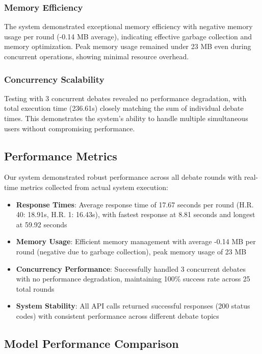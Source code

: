 \documentclass{article}
\begin{document}
\subsubsection{Memory Efficiency}
The system demonstrated exceptional memory efficiency with negative memory usage per round (-0.14 MB average), indicating effective garbage collection and memory optimization. Peak memory usage remained under 23 MB even during concurrent operations, showing minimal resource overhead.

\subsubsection{Concurrency Scalability}
Testing with 3 concurrent debates revealed no performance degradation, with total execution time (236.61s) closely matching the sum of individual debate times. This demonstrates the system's ability to handle multiple simultaneous users without compromising performance.

\subsection{Performance Metrics}

Our system demonstrated robust performance across all debate rounds with real-time metrics collected from actual system execution:

\begin{itemize}
    \item \textbf{Response Times}: Average response time of 17.67 seconds per round (H.R. 40: 18.91s, H.R. 1: 16.43s), with fastest response at 8.81 seconds and longest at 59.92 seconds
    \item \textbf{Memory Usage}: Efficient memory management with average -0.14 MB per round (negative due to garbage collection), peak memory usage of 23 MB
    \item \textbf{Concurrency Performance}: Successfully handled 3 concurrent debates with no performance degradation, maintaining 100\% success rate across 25 total rounds
    \item \textbf{System Stability}: All API calls returned successful responses (200 status codes) with consistent performance across different debate topics
\end{itemize}

\subsection{Model Performance Comparison}
\end{document}
